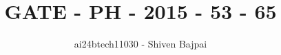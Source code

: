 \documentclass[journal]{IEEEtran}
\begin{document}
\onecolumn

\vspace{3cm}

\renewcommand{\thefigure}{\theenumi}
\renewcommand{\thetable}{\theenumi}

\title{GATE - PH - 2015 - 53 - 65}
\author{ai24btech11030 - Shiven Bajpai}
\maketitle

\iffalse
\begin{multicols}{4}
\begin{enumerate}
    \item 
    \item 
    \item 
    \item 
\end{enumerate}
\end{multicols}
\fi
\end{document}
